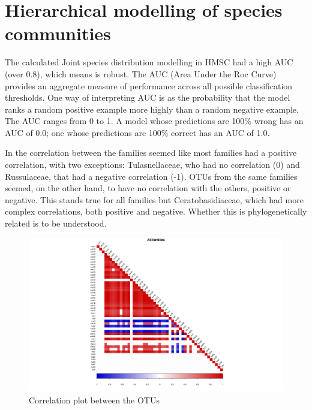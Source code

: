 \chapter{Hierarchical modelling of species communities}
\label{hierarchicalmodellingofspeciescommunities}

The calculated Joint species distribution modelling in HMSC had a high AUC (over 0.8), which means is robust. The AUC (Area Under the Roc Curve) provides an aggregate measure of performance across all possible classification thresholds. One way of interpreting AUC is as the probability that the model ranks a random positive example more highly than a random negative example. The AUC ranges from 0 to 1. A model whose predictions are 100\% wrong has an AUC of 0.0; one whose predictions are 100\% correct has an AUC of 1.0.

In the correlation between the families seemed like most families had a positive correlation, with two exceptions: Tulasnellaceae, who had no correlation (0) and Russulaceae, that had a negative correlation (-1). OTUs from the same families seemed, on the other hand, to have no correlation with the others, positive or negative. This stands true for all families but Ceratobasidiaceae, which had more complex correlations, both positive and negative. Whether this is phylogenetically related is to be understood.

\begin{figure}[htbp]
\centering
\includegraphics[keepaspectratio,width=\textwidth,height=0.75\textheight]{images/corrPlot.png}
\caption{Correlation plot between the OTUs}
\end{figure}

